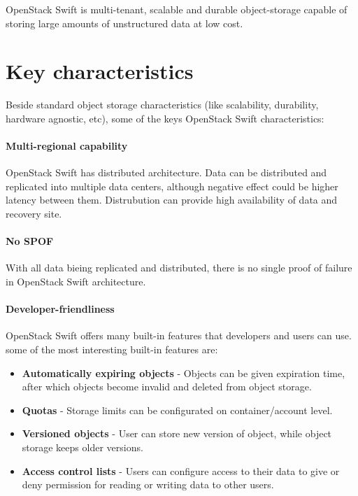     OpenStack Swift is multi-tenant, scalable and durable object-storage capable of storing large amounts of unstructured data at low cost\cite{swiftOpenStackSwift}.

    \section{Key characteristics}
    Beside standard object storage characteristics (like scalability, durability, hardware agnostic, etc), some of the keys OpenStack Swift characteristics:

    \paragraph{Multi-regional capability}
    OpenStack Swift has distributed architecture. Data can be distributed and replicated into multiple data centers, although negative effect could be higher latency between them. Distrubution can provide high availability of data and recovery site\cite{swiftOpenStackSwift}.

    \paragraph{No SPOF}
    With all data bieing replicated and distributed, there is no single proof of failure in OpenStack Swift architecture.

    \paragraph{Developer-friendliness}
    OpenStack Swift offers many built-in features that developers and users can use. some of the most interesting built-in features are\cite{swiftOpenStackSwift}:
    \begin{itemize}
        \item \textbf{Automatically expiring objects} - Objects can be given expiration time, after which objects become invalid and deleted from object storage.
        \item \textbf{Quotas} - Storage limits can be configurated on container/account level.
        \item \textbf{Versioned objects} - User can store new version of object, while object storage keeps older versions.
        \item \textbf{Access control lists} - Users can configure access to their data to give or deny permission for reading or writing data to other users.
    \end{itemize}

